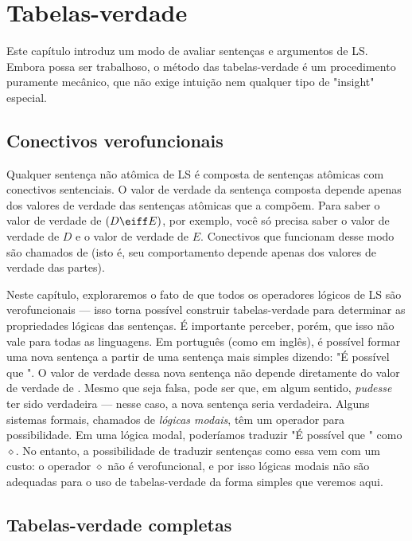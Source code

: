 \chapter{Tabelas-verdade}
\label{ch.TruthTables}

Este capítulo introduz um modo de avaliar sentenças e argumentos de LS. Embora possa ser trabalhoso, o método das tabelas-verdade é um procedimento puramente mecânico, que não exige intuição nem qualquer tipo de "insight" especial.

\section{Conectivos verofuncionais}

Qualquer sentença não atômica de LS é composta de sentenças atômicas com conectivos sentenciais. O valor de verdade da sentença composta depende apenas dos valores de verdade das sentenças atômicas que a compõem. Para saber o valor de verdade de $(D\eiff E)$, por exemplo, você só precisa saber o valor de verdade de $D$ e o valor de verdade de $E$. Conectivos que funcionam desse modo são chamados de  (isto é, seu comportamento depende apenas dos valores de verdade das partes).

Neste capítulo, exploraremos o fato de que todos os operadores lógicos de LS são verofuncionais — isso torna possível construir tabelas-verdade para determinar as propriedades lógicas das sentenças. É importante perceber, porém, que isso não vale para todas as linguagens. Em português (como em inglês), é possível formar uma nova sentença a partir de uma sentença mais simples  dizendo: "É possível que ". O valor de verdade dessa nova sentença não depende diretamente do valor de verdade de . Mesmo que  seja falsa, pode ser que, em algum sentido,  \emph{pudesse} ter sido verdadeira — nesse caso, a nova sentença seria verdadeira. Alguns sistemas formais, chamados de \emph{lógicas modais}, têm um operador para {possibilidade}. Em uma lógica modal, poderíamos traduzir "É possível que " como {\large $\diamond$}. No entanto, a possibilidade de traduzir sentenças como essa vem com um custo: o operador {\large $\diamond$} não é verofuncional, e por isso lógicas modais não são adequadas para o uso de tabelas-verdade da forma simples que veremos aqui.


\section{Tabelas-verdade completas}

